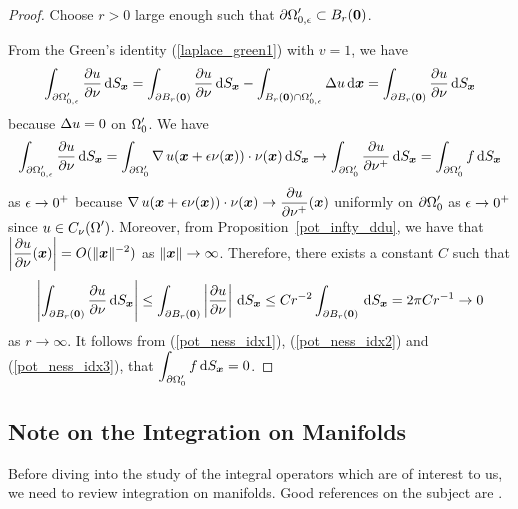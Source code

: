 \begin{proof}
Choose $r>0$ large enough such that
$\displaystyle \partial \Omega^{\prime}_{0,\epsilon} \subset B_r({\bm{0}})$.

From the Green's identity (\ref{laplace_green1}) with $v=1$, we have
\begin{equation} \label{pot_ness_idx1}
\int_{\partial \Omega^{\prime}_{0,\epsilon}} \frac{\partial{u}}{\partial \nu} \,\mathrm{d}{S}_{{\bm{x}}}
= \int_{\partial B_r({\bm{0}})} \frac{\partial{u}}{\partial \nu} \,\mathrm{d}{S}_{{\bm{x}}}
- \int_{B_r({\bm{0}}) \cap \Omega^{\prime}_{0,\epsilon}} \Delta u \,\mathrm{d}{{\bm{x}}} =
\int_{\partial B_r({\bm{0}})} \frac{\partial{u}}{\partial \nu} \,\mathrm{d}{S}_{{\bm{x}}}
\end{equation}
because $\displaystyle \Delta u = 0$ on $\displaystyle \Omega_0^{\prime}$.
We have
\begin{equation} \label{pot_ness_idx2}
\int_{\partial \Omega^{\prime}_{0,\epsilon}} \frac{\partial{u}}{\partial \nu} \,\mathrm{d}{S}_{{\bm{x}}}
= \int_{\partial \Omega^{\prime}_0} \operatorname{\nabla} u({\bm{x}}
+ \epsilon \nu({\bm{x}}))
\cdot \nu({\bm{x}}) \,\mathrm{d}{S}_{{\bm{x}}}
\rightarrow \int_{\partial \Omega^{\prime}_0}
\frac{\partial{u}}{\partial \nu^+} \,\mathrm{d}{S}_{{\bm{x}}}
= \int_{\partial \Omega^{\prime}_0} f \,\mathrm{d}{S}_{{\bm{x}}}
\end{equation}
as $\displaystyle \epsilon \rightarrow 0^+$ because
$\displaystyle \operatorname{\nabla} u({\bm{x}} + \epsilon \nu({\bm{x}})) \cdot \nu({\bm{x}})
\to \frac{\partial{u}}{\partial \nu^+}({\bm{x}})$ uniformly on
$\displaystyle \partial \Omega^{\prime}_0$ as
$\displaystyle \epsilon \to 0^+$ since
$\displaystyle u \in C_{\nu}(\Omega^{\prime})$.
Moreover, from Proposition~\ref{pot_infty_ddu}, we have that 
$\displaystyle \left| \frac{\partial{u}}{\partial \nu}({\bm{x}})\right| =
O(\|{\bm{x}}\|^{-2})$ as $\|{\bm{x}}\|\rightarrow \infty$.  Therefore,
there exists a constant $C$ such that
\begin{equation} \label{pot_ness_idx3}
\left| \int_{\partial B_r({\bm{0}})} \frac{\partial{u}}{\partial \nu} 
\,\mathrm{d}{S}_{{\bm{x}}} \right| \leq
\int_{\partial B_r({\bm{0}})} \left| \frac{\partial{u}}{\partial \nu} \right|
\,\mathrm{d}{S}_{{\bm{x}}} \leq C r^{-2} \int_{\partial B_r({\bm{0}})}
\,\mathrm{d}{S}_{{\bm{x}}}
= 2\pi C r^{-1} \rightarrow 0
\end{equation}
as $r \rightarrow \infty$.
It follows from (\ref{pot_ness_idx1}), (\ref{pot_ness_idx2}) and
(\ref{pot_ness_idx3}), that
$\displaystyle \int_{\partial \Omega^{\prime}_0} f \,\mathrm{d}{S}_{{\bm{x}}} = 0$.
\end{proof}

\subsection{Note on the Integration on Manifolds} \label{pot_int_man}

Before diving into the study of the integral operators which are of
interest to us, we need to review integration on manifolds.  Good
references on the subject are \cite{Ab,Sp}.

